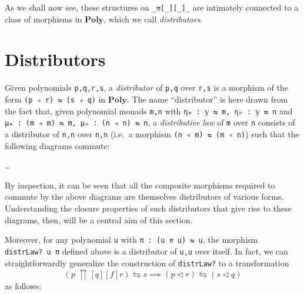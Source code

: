 \documentclass[
  11pt,
  oneside,
  article]{memoir}
\theoremstyle{definition}
\theoremstyle{plain}
\newcommand{\Cat}[1]{\mathbf{#1}}%
\newcommand{\poly}{\Cat{Poly}}
\newcommand{\0}{\textsf{0}}
\newcommand{\1}{\tn{\textsf{1}}}
\begin{document}
As we shall now see, these structures on \texttt{\_⇈{[}\_{]}{[}\_{]}\_}
are intimately connected to a class of morphisms in \(\poly\),
which we call \emph{distributors}.

\section{Distributors}\label{distributors}

Given polynomials \texttt{p,q,r,s}, a \emph{distributor} of \texttt{p,q}
over \texttt{r,s} is a morphism of the form
\texttt{(p\ ◃\ r)\ ⇆\ (s\ ◃\ q)} in \(\poly\). The name
``distributor'' is here drawn from the fact that, given polynomial
monads \texttt{m,n} with \texttt{ηₘ\ :\ 𝕪\ ⇆\ m,\ ηₙ\ :\ 𝕪\ ⇆\ n} and
\texttt{μₘ\ :\ (m\ ◃\ m)\ ⇆\ m,\ μₙ\ :\ (n\ ◃\ n)\ ⇆\ n}, a
\emph{distributive law} of \texttt{m} over \texttt{n} consists of a
distributor of \texttt{n,n} over \texttt{n,n} (i.e.~a morphism
\texttt{(n\ ◃\ m)\ ⇆\ (m\ ◃\ n)}) such that the following diagrams
commute:

\ldots{}

By inspection, it can be seen that all the composite morphisms required
to commute by the above diagrams are themselves distributors of various
forms. Understanding the closure properties of such distributors that
give rise to these diagrams, then, will be a central aim of this
section.

Moreover, for any polynomial \texttt{u} with
\texttt{π\ :\ (u\ ⇈\ u)\ ⇆\ u}, the morphism \texttt{distrLaw?\ u\ π}
defined above is a distributor of \texttt{u,u} over itself. In fact, we
can straightforwardly generalize the construction of \texttt{distrLaw?}
to a transformation \[
(p ~{\upuparrows}[q][f] r) \leftrightarrows s \implies (p \triangleleft r) \leftrightarrows (s \triangleleft q)
\] as follows:
\end{document}

